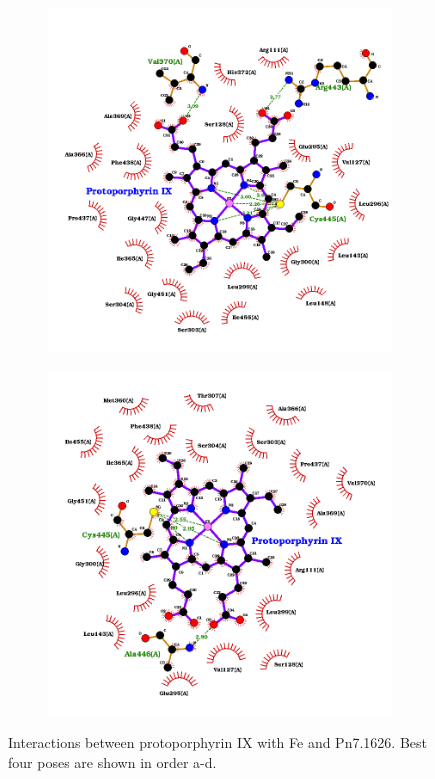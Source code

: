 \documentclass[12pt]{article}
\begin{document}
\begin{figure}[h!]
\begin{subfigure}[h!]{0.35\textwidth}
			\caption{}
		\end{subfigure}
		\hfill
		\begin{subfigure}[h!]{0.35\textwidth}
			\hspace{2cm}
			\includegraphics[width=\textwidth]{../5/propose/Dock/best3.png}
			\caption{}
		\end{subfigure}
		\hfill
		\begin{subfigure}[h!]{0.35\textwidth}
			\hspace{-2cm}
			\includegraphics[width=\textwidth]{../5/propose/Dock/best4.png}
			\caption{}
		\end{subfigure}
		\hfill
		\caption[Interactions between protoporphyrin IX with Fe and Pn7.1626.]{\centering Interactions between protoporphyrin IX with Fe and Pn7.1626. Best four poses are shown in order a-d.}
		\label{fig5p_3}
	\end{figure}
\end{document}
